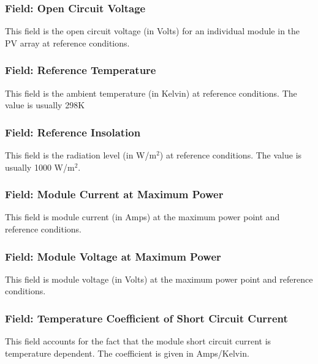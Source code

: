 \subsubsection{Field: Open Circuit Voltage}\label{field-open-circuit-voltage}

This field is the open circuit voltage (in Volts) for an individual module in the PV array at reference conditions.

\subsubsection{Field: Reference Temperature}\label{field-reference-temperature-000}

This field is the ambient temperature (in Kelvin) at reference conditions. The value is usually 298K

\subsubsection{Field: Reference Insolation}\label{field-reference-insolation}

This field is the radiation level (in W/m\(^{2}\)) at reference conditions. The value is usually 1000 W/m\(^{2}\).

\subsubsection{Field: Module Current at Maximum Power}\label{field-module-current-at-maximum-power}

This field is module current (in Amps) at the maximum power point and reference conditions.

\subsubsection{Field: Module Voltage at Maximum Power}\label{field-module-voltage-at-maximum-power}

This field is module voltage (in Volts) at the maximum power point and reference conditions.

\subsubsection{Field: Temperature Coefficient of Short Circuit Current}\label{field-temperature-coefficient-of-short-circuit-current}

This field accounts for the fact that the module short circuit current is temperature dependent. The coefficient is given in Amps/Kelvin.

